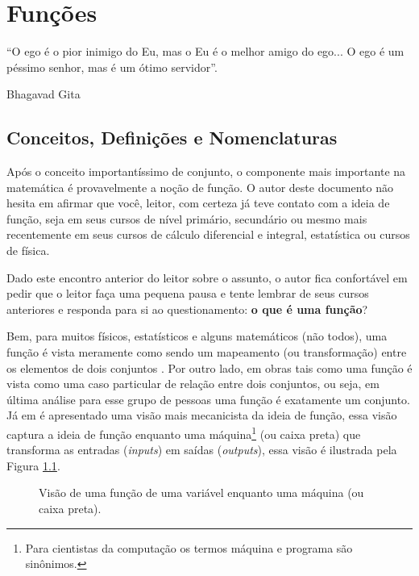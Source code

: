 \chapter{Funções}\label{cap:Functions}

\epigraph{``O ego é o pior inimigo do Eu, mas o Eu é o melhor amigo do ego... O ego é um péssimo senhor, mas é um ótimo servidor''.}{Bhagavad Gita}

\section{Conceitos, Definições e Nomenclaturas}\label{sec:FunctionsDefinitions}

Após o conceito importantíssimo de conjunto, o componente mais importante na matemática é provavelmente a noção de função. O autor deste documento não hesita em afirmar que você, leitor, com certeza já teve contato com a ideia de função, seja em seus cursos de nível primário, secundário ou mesmo mais recentemente em seus cursos de cálculo diferencial e integral, estatística ou cursos de física.

Dado este encontro anterior do leitor sobre o assunto, o autor fica confortável em pedir que o leitor faça uma pequena pausa e tente lembrar de seus cursos anteriores e responda para si ao questionamento: \textbf{o que é uma função}?

Bem, para muitos físicos, estatísticos e alguns matemáticos (não todos), uma função é vista meramente como sendo um mapeamento (ou transformação) entre os elementos de dois conjuntos \cite{abe1991-TC}. Por outro lado, em obras tais como \cite{sussana2010-MD, lipschutz1971-Topo, lipschutz1978-TC, lipschutz2013-MD, Gerard2021discreta} uma função é vista como uma caso particular de relação entre dois conjuntos, ou seja, em última análise para esse grupo de pessoas uma função é exatamente um conjunto. Já em \cite{edward2019-MD, fmcbook} é apresentado uma visão mais mecanicista da ideia de função, essa visão captura a ideia de função enquanto uma máquina\footnote{Para cientistas da computação os termos máquina e programa são sinônimos.} (ou caixa preta) que transforma as entradas (\textit{inputs}) em saídas (\textit{outputs}), essa visão é ilustrada pela Figura \ref{fig:FuncaoBlackBox}. 

\begin{figure}[h]
	\centering
	\caption{Visão de uma função de uma variável enquanto uma máquina (ou caixa preta).}
	\label{fig:FuncaoBlackBox}
\end{figure}

